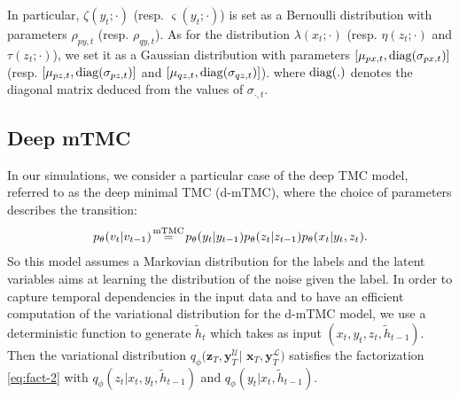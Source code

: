 \documentclass{article}
\def\x{{\mathbf x}}
\def\z{{\mathbf z}}
\def\yl{{\mathbf y}_{T}^{\mathcal{L}}}
\def\yu{{\mathbf y}_{T}^{\mathcal{U}}}
\def\N{{\mathcal N}}
\def\Ber{{\mathcal Ber}}
\def\p{p_{\theta}}
\def\q{q_\phi}
\begin{document}
In particular, $\zeta(y_t; \cdot )$ (resp. $\varsigma(y_t;\cdot)$) is set  as a Bernoulli distribution with parameters $\rho_{py,t}$ (resp. $\rho_{qy,t}$). 
As for the distribution  $\lambda(x_t; \cdot )$ (resp. $\eta(z_t;\cdot)$ and  $\tau(z_t;\cdot)$), we set it as a Gaussian distribution with parameters $[ \mu_{px,t}, {\rm diag}(\sigma_{px,t})]$ (resp.  $[ \mu_{pz,t}, {\rm diag}(\sigma_{pz,t})]$ and $[ \mu_{qz,t}, {\rm diag}(\sigma_{qz,t})]$).
where ${\rm diag(.)}$ denotes the diagonal matrix deduced from the values 
of $\sigma_{\cdot,t}$.

\subsection{Deep mTMC}

In our simulations, we consider a particular case of the deep TMC model,
referred to as the deep minimal TMC (d-mTMC), where the choice of parameters describes the transition:
\begin{align}
    \label{eq:mTMC}
    \p(v_t|v_{t-1}) \!\overset{\rm mTMC}{=} \!\p(y_t|y_{t-1}) \p(z_t|z_{t-1}) \p(x_t|y_t,z_t) \text{.}
\end{align}
So this model assumes a Markovian distribution 
for the labels and the latent variables aims at 
learning the distribution of the noise given the label.  %
In order to capture temporal dependencies in the input data and to have an efficient computation of the variational distribution for the d-mTMC model, we use a deterministic function to generate $\tilde{h}_t$ which  
takes as input $(x_t, y_t, z_t, \tilde{h}_{t-1})$. 
Then the variational distribution $\q(\z_T, \yu|$ $ \x_T, \yl)$ satisfies the factorization \eqref{eq:fact-2}
with $\q(z_t|x_t, y_t,\tilde{h}_{t-1} )$ and $\q(y_t|x_t, \tilde{h}_{t-1})$. 
\end{document}
